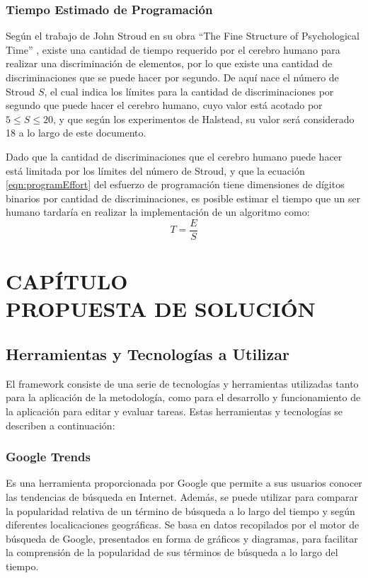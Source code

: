 \documentclass[letterpaper,12pt]{article}
\newcommand{\secnumbersection}[1]{
\addtocounter{section}{1}
\section*{CAPÍTULO \thesection \texorpdfstring{\\}\ #1}
\addcontentsline{toc}{section}{CAPÍTULO \thesection : #1}
\setcounter{subsection}{0}
}
\begin{document}
\subsubsection{Tiempo Estimado de Programación}

Según el trabajo de John Stroud en su obra ``The Fine Structure of Psychological Time'' \cite{https://doi.org/10.1111/j.1749-6632.1967.tb55012.x}, existe una cantidad de tiempo requerido por el cerebro humano para realizar una discriminación de elementos, por lo que existe una cantidad de discriminaciones que se puede hacer por segundo. De aquí nace el número de Stroud $S$, el cual indica los límites para la cantidad de discriminaciones por segundo que puede hacer el cerebro humano, cuyo valor está acotado por $5 \leq S \leq 20$, y que según los experimentos de Halstead, su valor será considerado 18 a lo largo de este documento.

Dado que la cantidad de discriminaciones que el cerebro humano puede hacer está limitada por los límites del número de Stroud, y que la ecuación \ref{eqn:programEffort} del esfuerzo de programación tiene dimensiones de dígitos binarios por cantidad de discriminaciones, es posible estimar el tiempo que un ser humano tardaría en realizar la implementación de un algoritmo como:
\begin{equation}
  T = \frac{E}{S}
\end{equation}

\newpage

\secnumbersection{PROPUESTA DE SOLUCIÓN} \label{sec:propuesta}

\subsection{Herramientas y Tecnologías a Utilizar}

El framework consiste de una serie de tecnologías y herramientas utilizadas tanto para la aplicación de la metodología, como para el desarrollo y funcionamiento de la aplicación para editar y evaluar tareas. Estas herramientas y tecnologías se describen a continuación:

\subsubsection{Google Trends}

Es una herramienta proporcionada por Google que permite a sus usuarios conocer las tendencias de búsqueda en Internet. Además, se puede utilizar para comparar la popularidad relativa de un término de búsqueda a lo largo del tiempo y según diferentes localicaciones geográficas. Se basa en datos recopilados por el motor de búsqueda de Google, presentados en forma de gráficos y diagramas, para facilitar la comprensión de la popularidad de sus términos de búsqueda a lo largo del tiempo.
\end{document}

